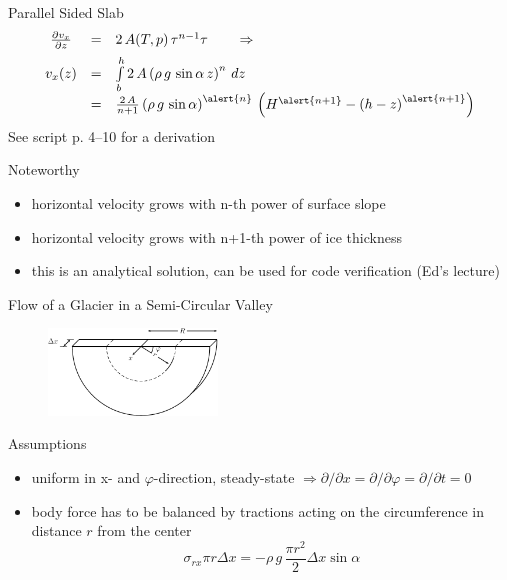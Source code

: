 \documentclass[hide notes,intlimits,unknownkeysallowed]{beamer}
\begin{document}
\begin{frame}{Parallel Sided Slab}
\begin{equation*}
    \begin{array}{ccl}
      \frac{\partial v_x}{\partial z}  & = &  2\,A(T,p)\,\tau^{n-1}\tau \qquad \Rightarrow \\[.5em]
      v_x (z) &  = & \int \limits_{b}^{h} 2\,A\left(\rho\,g\,\sin{\alpha}\,z\right)^{n}\,dz \\[.5em]
& = &\frac{2\,A}{n+1} \left(\rho\,g\,\sin{\alpha}\right)^{\alert{n}}\,\left(H^{\alert{n+1}} - \left(h-z\right)^{\alert{n+1}}\right)
    \end{array}
  \end{equation*}
See script p. 4--10 for a derivation
\begin{block}{Noteworthy}
\begin{itemize}
\item horizontal velocity grows with \alert{n}-th power of surface slope
\item horizontal velocity grows with \alert{n+1}-th power of ice thickness
\item this is an analytical solution, can be used for code verification (Ed's lecture)
\end{itemize}
\end{block}
\end{frame}

\begin{frame}{Flow of a Glacier in a Semi-Circular Valley}
  \vspace{-1em}
  \begin{figure}
    \centering
    \includegraphics[width=0.4\textwidth]{fig_channel}
    \label{fig:valley-glacier-coord}
  \end{figure}
  \begin{block}{Assumptions}
    \begin{itemize}
    \item uniform in x- and $\varphi$-direction, steady-state $\Rightarrow \partial / \partial x = \partial / \partial \varphi = \partial / \partial t = 0$
    \item body force has to be balanced by tractions acting on the circumference in distance $r$ from the center
      \begin{equation*}
        \sigma_{rx} \pi r \Delta x = - \rho\,g\,\frac{\pi r^2}{2} \Delta x \sin \alpha
      \end{equation*}
\end{itemize}
  \end{block}
\end{frame}
\end{document}
